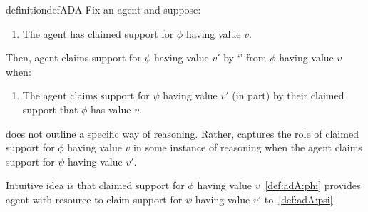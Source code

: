 

\begin{note}
  \begin{restatable}[\adA{}]{definition}{defADA}\label{AR:adA}\label{def:adA}
    Fix an agent and suppose:
    \begin{enumerate}[label=\textsf{S:\arabic*}., ref=(\textsf{S}:\arabic*), series=adA_counter]
    \item\label{def:adA:phi} The agent has claimed support for \(\phi\) having value \(v\).
    \end{enumerate}
    Then, agent claims support for \(\psi\) having value \(v'\) by `\adA{}' from \(\phi\) having value \(v\) when:
    \begin{enumerate}[label=\textsf{S:\arabic*}., ref=(\textsf{S}:\arabic*), resume*=adA_counter]
    \item\label{def:adA:psi} The agent claims support for \(\psi\) having value \(v'\) (in part) by their claimed support that \(\phi\) has value \(v\).
    \end{enumerate}
    \vspace{-\baselineskip}
  \end{restatable}
\end{note}

\begin{note}
  \adA{} does not outline a specific way of reasoning.
  Rather, captures the role of claimed support for \(\phi\) having value \(v\) in some instance of reasoning when the agent claims support for \(\psi\) having value \(v'\).

  Intuitive idea is that claimed support for \(\phi\) having value \(v\)~\ref{def:adA:phi} provides agent with resource to claim support for \(\psi\) having value \(v'\) to~\ref{def:adA:psi}.
\end{note}

